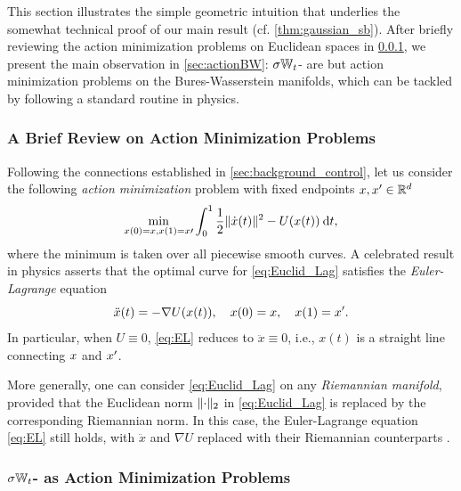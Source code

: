 This section illustrates the simple geometric intuition that underlies the somewhat technical proof of our main result (cf. \cref{thm:gaussian_sb}). After briefly reviewing the action minimization problems on Euclidean spaces in \cref{sec:actionRd}, we present the main observation in \cref{sec:actionBW}: $\sigma\mathbb{W}_{t}$- are but action minimization problems on the Bures-Wasserstein manifolds, which can be tackled by following a standard routine in physics. 

\subsubsection{A Brief Review on Action Minimization Problems} %
\label{sec:actionRd}

Following the connections established in \cref{sec:background_control}, let us consider the following \emph{action minimization} problem with fixed endpoints $x, x' \in \mathbb{R}^d$
\begin{align}
\label{eq:Euclid_Lag}
\min_{x(0) = x, x(1) = x\prime} \int_0^1 {\frac{1}{2} \lVert\dot{x}(t)\rVert^2 - U(x(t)) } \:\mathrm{d} t,
\end{align}
where the minimum is taken over all piecewise smooth curves. 
A celebrated result in physics asserts that the optimal curve for \eqref{eq:Euclid_Lag} satisfies the \emph{Euler-Lagrange} equation
\begin{equation}
\label{eq:EL}
\ddot{x}(t) = -\nabla U(x(t)), \quad x(0) = x,\quad x(1) = x'.
\end{equation}
In particular, when $U \equiv0$, \eqref{eq:EL} reduces to $\ddot{x} \equiv 0$, i.e., $x(t)$ is a straight line connecting $x$ and $x'$.

More generally, one can consider \eqref{eq:Euclid_Lag} on any \emph{Riemannian manifold}, provided that the Euclidean norm $\lVert\cdot\rVert_2$ in \eqref{eq:Euclid_Lag} is replaced by the corresponding Riemannian norm. In this case, the Euler-Lagrange equation \eqref{eq:EL} still holds, with $\ddot{x}$ and $\nabla U$ replaced with their Riemannian counterparts \citep{villani2009optimal}.

\subsubsection{$\sigma\mathbb{W}_{t}$- as Action Minimization Problems}

